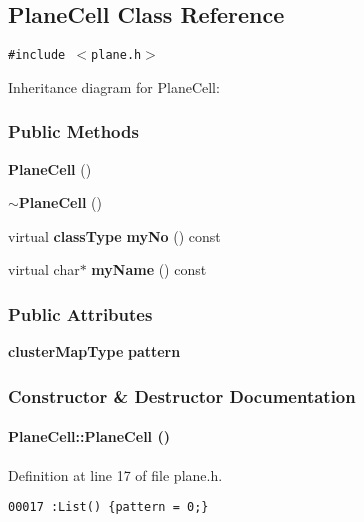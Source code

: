 \subsection{Plane\-Cell  Class Reference}
\label{PlaneCell}
{\tt \#include $<$plane.h$>$}

Inheritance diagram for Plane\-Cell:\begin{figure}[H]
\begin{center}
\leavevmode
\setlength{\epsfysize}{5cm}
\end{center}
\end{figure}
\subsubsection*{Public Methods}
\begin{CompactItemize}
\item 
{\bf Plane\-Cell} ()
\item 
{\bf $\sim$Plane\-Cell} ()
\item 
virtual {\bf class\-Type} {\bf my\-No} () const
\item 
virtual char$\ast$ {\bf my\-Name} () const
\end{CompactItemize}
\subsubsection*{Public Attributes}
\begin{CompactItemize}
\item 
{\bf cluster\-Map\-Type} {\bf pattern}
\end{CompactItemize}


\subsubsection{Constructor \& Destructor Documentation}
\label{PlaneCell_a0}
\paragraph{\setlength{\rightskip}{0pt plus 5cm}Plane\-Cell::Plane\-Cell ()}\hfill



Definition at line 17 of file plane.h.\small\begin{verbatim}00017 :List() {pattern = 0;}
\end{verbatim}\normalsize 
\label{PlaneCell_a1}
